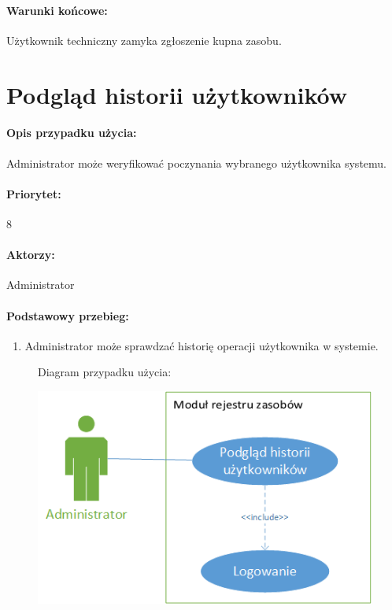 \documentclass[11pt, a4paper, oneside]{report}
\begin{document}
\paragraph{Warunki końcowe:} Użytkownik techniczny zamyka zgłoszenie kupna zasobu.

\section{Podgląd historii użytkowników}
\paragraph{Opis przypadku użycia:} Administrator może weryfikować poczynania wybranego użytkownika systemu.
\paragraph{Priorytet:} 8
\paragraph{Aktorzy:} Administrator
\paragraph{Podstawowy przebieg:}
\begin{enumerate}
\item Administrator może sprawdzać historię operacji użytkownika w systemie.
\end{enumerate}

\begin{figure}[H]
Diagram przypadku użycia:

\centering
\includegraphics[scale=1]{admin_statystyki.png}
\end{figure}
\end{document}
